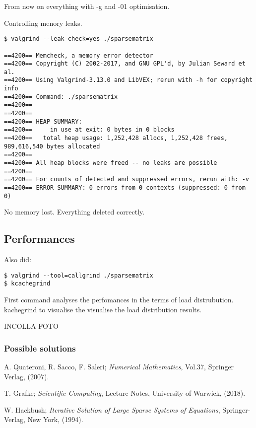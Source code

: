 \documentclass{article}
\theoremstyle{theorem}
\theoremstyle{definition}
\begin{document}
From now on everything with -g and -01 optimisation. 

Controlling menory leaks.

\begin{verbatim}
$ valgrind --leak-check=yes ./sparsematrix

==4200== Memcheck, a memory error detector
==4200== Copyright (C) 2002-2017, and GNU GPL'd, by Julian Seward et al.
==4200== Using Valgrind-3.13.0 and LibVEX; rerun with -h for copyright info
==4200== Command: ./sparsematrix
==4200== 
==4200== 
==4200== HEAP SUMMARY:
==4200==     in use at exit: 0 bytes in 0 blocks
==4200==   total heap usage: 1,252,428 allocs, 1,252,428 frees, 989,616,540 bytes allocated
==4200== 
==4200== All heap blocks were freed -- no leaks are possible
==4200== 
==4200== For counts of detected and suppressed errors, rerun with: -v
==4200== ERROR SUMMARY: 0 errors from 0 contexts (suppressed: 0 from 0)
\end{verbatim}

No memory lost. Everything deleted correctly.

\subsection{Performances}
\label{subsec:perf}

Also did:
\begin{verbatim}
$ valgrind --tool=callgrind ./sparsematrix
$ kcachegrind
\end{verbatim}

First command analyses the perfomances in the terms of load distrubution. kachegrind to visualise the visualise the load distribution results.

INCOLLA FOTO

\subsubsection{Possible solutions}



\cleardoublepage
\begin{thebibliography}{99}

 A. Quateroni, R. Sacco, F. Saleri;
\emph{Numerical Mathematics}, Vol.37, Springer Verlag, (2007).

 T. Grafke;
\emph{Scientific Computing}, Lecture Notes, University of Warwick, (2018).

 W. Hackbush; 
\emph{Iterative Solution of Large Sparse Systems of Equations}, Springer-Verlag, New York, (1994).







\printindex
\end{thebibliography}
\end{document}
